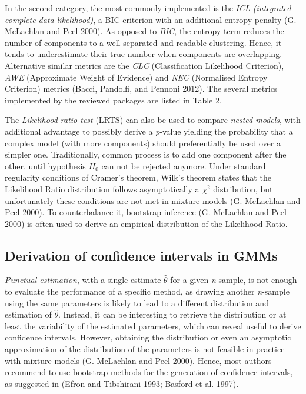In the second category, the most commonly implemented is the \emph{ICL
(integrated complete-data likelihood)}, a BIC criterion with an
additional entropy penalty (G. McLachlan and Peel 2000). As opposed to \emph{BIC},
the entropy term reduces the number of components to a well-separated
and readable clustering. Hence, it tends to underestimate their true
number when components are overlapping. Alternative similar metrics are
the \emph{CLC} (Classification Likelihood Criterion), \emph{AWE} (Approximate
Weight of Evidence) and \emph{NEC} (Normalised Entropy Criterion) metrics
(Bacci, Pandolfi, and Pennoni 2012). The several metrics implemented by the reviewed
packages are listed in Table 2.

The \emph{Likelihood-ratio test} (LRTS) can also be used to compare \emph{nested
models}, with additional advantage to possibly derive a \emph{p}-value
yielding the probability that a complex model (with more components)
should preferentially be used over a simpler one. Traditionally, common
process is to add one component after the other, until hypothesis \(H_0\)
can not be rejected anymore. Under standard regularity conditions of
Cramer's theorem, Wilk's theorem states that the Likelihood Ratio
distribution follows asymptotically a \(\chi^2\) distribution, but
unfortunately these conditions are not met in mixture models
(G. McLachlan and Peel 2000). To counterbalance it, bootstrap inference
(G. McLachlan and Peel 2000) is often used to derive an empirical distribution of
the Likelihood Ratio.

\hypertarget{derivation-of-confidence-intervals-in-gmms}{%
\subsection{Derivation of confidence intervals in GMMs}\label{derivation-of-confidence-intervals-in-gmms}}

\emph{Punctual estimation}, with a single estimate \(\hat{\theta}\) for a given
\emph{n}-sample, is not enough to evaluate the performance of a specific
method, as drawing another \emph{n}-sample using the same parameters is
likely to lead to a different distribution and estimation of
\(\hat{\theta}\). Instead, it can be interesting to retrieve the
distribution or at least the variability of the estimated parameters,
which can reveal useful to derive confidence intervals. However,
obtaining the distribution or even an asymptotic approximation of the
distribution of the parameters is not feasible in practice with mixture
models (G. McLachlan and Peel 2000). Hence, most authors recommend to use
bootstrap methods for the generation of confidence intervals, as
suggested in (Efron and Tibshirani 1993; Basford et al. 1997).


